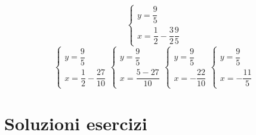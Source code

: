 \begin{exercise}{}
\[	\begin{cases}
		y=\dfrac{9}{5}\\
		x=\dfrac{1}{2}-\dfrac{3}{2}\dfrac{9}{5}
	\end{cases}
	\]
	\[
	\begin{cases}
		y=\dfrac{9}{5}\\
			x=\dfrac{1}{2}-\dfrac{27}{10}
	\end{cases}
	\begin{cases}
			y=\dfrac{9}{5}\\
		x=\dfrac{5-27}{10}
	\end{cases}
\begin{cases}
	y=\dfrac{9}{5}\\
	x=-\dfrac{22}{10}
\end{cases}
\begin{cases}
	y=\dfrac{9}{5}\\
	x=-\dfrac{11}{5}
\end{cases}
	\]
\end{exercise}
\tcbstoprecording
\newpage
\chapter{Soluzioni esercizi}
\tcbinputrecords